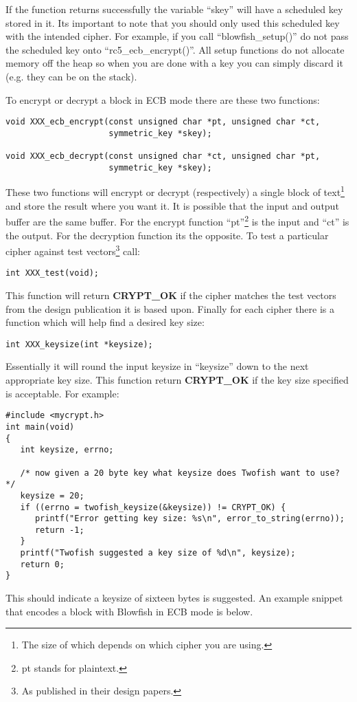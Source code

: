 \documentclass[b5paper]{book}
\begin{document}
If the function returns successfully the variable ``skey'' will have a scheduled key stored in it.  Its important to note
that you should only used this scheduled key with the intended cipher.  For example, if you call 
``blowfish\_setup()'' do not pass the scheduled key onto ``rc5\_ecb\_encrypt()''.  All setup functions do not allocate 
memory off the heap so when you are done with a key you can simply discard it (e.g. they can be on the stack).

To encrypt or decrypt a block in ECB mode there are these two functions:
 
\begin{verbatim}
void XXX_ecb_encrypt(const unsigned char *pt, unsigned char *ct,
                     symmetric_key *skey);

void XXX_ecb_decrypt(const unsigned char *ct, unsigned char *pt,
                     symmetric_key *skey);
\end{verbatim}
These two functions will encrypt or decrypt (respectively) a single block of text\footnote{The size of which depends on
which cipher you are using.} and store the result where you want it.  It is possible that the input and output buffer are 
the same buffer.  For the encrypt function ``pt''\footnote{pt stands for plaintext.} is the input and ``ct'' is the output.
For the decryption function its the opposite.  To test a particular cipher against test vectors\footnote{As published in their design papers.} call: 
\begin{verbatim}
int XXX_test(void);
\end{verbatim}
This function will return {\bf CRYPT\_OK} if the cipher matches the test vectors from the design publication it is 
based upon.  Finally for each cipher there is a function which will help find a desired key size:
\begin{verbatim}
int XXX_keysize(int *keysize);
\end{verbatim}
Essentially it will round the input keysize in ``keysize'' down to the next appropriate key size.  This function
return {\bf CRYPT\_OK} if the key size specified is acceptable.  For example:
\begin{small}
\begin{verbatim}
#include <mycrypt.h>
int main(void)
{
   int keysize, errno;

   /* now given a 20 byte key what keysize does Twofish want to use? */
   keysize = 20;
   if ((errno = twofish_keysize(&keysize)) != CRYPT_OK) {
      printf("Error getting key size: %s\n", error_to_string(errno));
      return -1;
   }
   printf("Twofish suggested a key size of %d\n", keysize);
   return 0;
}
\end{verbatim}
\end{small}
This should indicate a keysize of sixteen bytes is suggested.  An example snippet that encodes a block with 
Blowfish in ECB mode is below.
\end{document}
